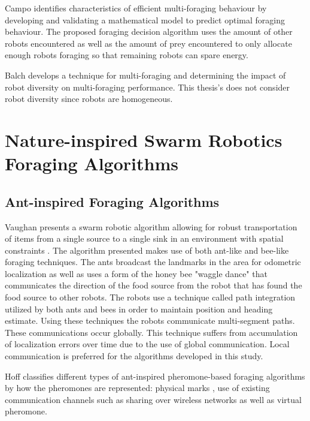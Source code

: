 \begin{itemize}
Campo \cite{campo2007efficient} identifies characteristics of efficient multi-foraging behaviour by developing and validating a mathematical model to predict optimal foraging behaviour. The proposed foraging decision algorithm uses the amount of other robots encountered as well as the amount of prey encountered to only allocate enough robots foraging  so that remaining robots can spare energy.

Balch \cite{balch1999impact} develops a technique for multi-foraging and determining the impact of robot diversity on multi-foraging performance. This thesis's does not consider robot diversity since robots are homogeneous.

\end{itemize}




\section{Nature-inspired Swarm Robotics Foraging Algorithms}

\subsection{Ant-inspired Foraging Algorithms}
\label{sec:second:natureinspired:ant}

Vaughan presents a swarm robotic algorithm allowing for robust transportation of items from a single source to a single sink in an environment with spatial constraints \cite{vaughan2000blazing}. The algorithm presented makes use of both ant-like and bee-like foraging techniques. The ants broadcast the landmarks in the area for odometric localization as well as uses a form of the  honey bee "waggle dance" that communicates the direction of the food source from the robot that has found the food source to other robots. The robots use a technique called path integration utilized by both ants and bees in order to maintain position and heading estimate. Using these techniques the robots communicate multi-segment paths. These communications occur globally. This technique suffers from accumulation of localization errors over time due to the use of global communication. Local communication is preferred for the algorithms developed in this study.

Hoff \cite{hoff2010two} classifies different types of ant-inspired pheromone-based foraging algorithms by how the pheromones are represented: physical marks \cite{alcoholfromants2012}, use of existing communication channels such as sharing over wireless networks as well as virtual pheromone. %

